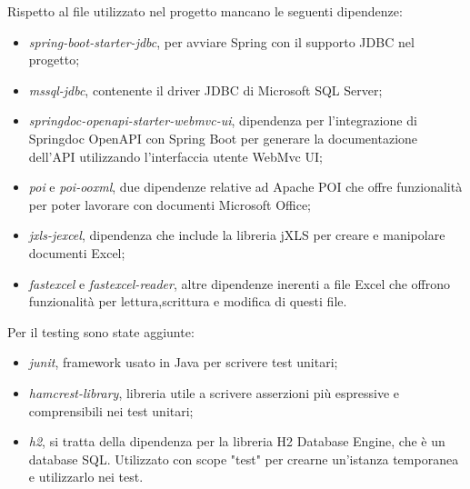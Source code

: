 Rispetto al file utilizzato nel progetto mancano le seguenti dipendenze:
\begin{itemize}
\item \textit{spring-boot-starter-jdbc}, per avviare Spring con il supporto JDBC nel progetto;
\item \textit{mssql-jdbc}, contenente il driver JDBC di Microsoft SQL Server;
\item \textit{springdoc-openapi-starter-webmvc-ui}, dipendenza per l'integrazione di Springdoc OpenAPI con Spring Boot per generare la documentazione dell'API utilizzando l'interfaccia utente WebMvc UI;
\item \textit{poi} e \textit{poi-ooxml}, due dipendenze relative ad Apache POI che offre funzionalità per poter lavorare con documenti Microsoft Office;
\item \textit{jxls-jexcel}, dipendenza che include la libreria jXLS per creare e manipolare documenti Excel;
\item \textit{fastexcel} e \textit{fastexcel-reader}, altre dipendenze inerenti a file Excel che offrono funzionalità per lettura,scrittura e modifica di questi file.
\end{itemize}
Per il testing sono state aggiunte:
\begin{itemize}
\item \textit{junit}, framework usato in Java per scrivere test unitari;
\item \textit{hamcrest-library}, libreria utile a scrivere asserzioni più espressive e comprensibili nei test unitari;
\item \textit{h2}, si tratta della dipendenza per la libreria H2 Database Engine, che è un database SQL. Utilizzato con scope "test" per crearne un'istanza temporanea e utilizzarlo nei test.
\end{itemize}

%
%
%

